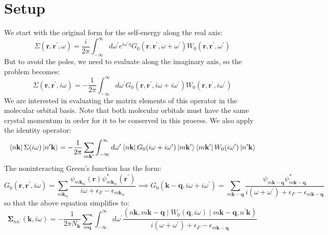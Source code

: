 \documentclass[12pt]{article}
\begin{document}
\section{Setup}
We start with the original form for the self-energy along the real axis:
\begin{equation}
\Sigma\left(\mathbf{r}, \mathbf{r}^{\prime}, \omega\right)=\frac{i}{2 \pi} \int_{-\infty}^{\infty} d \omega^{\prime} e^{i \omega^{\prime} \eta} G_{0}\left(\mathbf{r}, \mathbf{r}^{\prime}, \omega+\omega^{\prime}\right) W_{0}\left(\mathbf{r}, \mathbf{r}^{\prime}, \omega^{\prime}\right)
\end{equation}
But to avoid the poles, we need to evaluate along the imaginary axis, so the problem becomes:
\begin{equation*}
\Sigma\left(\mathbf{r}, \mathbf{r}^{\prime}, i \omega\right)=-\frac{1}{2 \pi} \int_{-\infty}^{\infty} d \omega^{\prime} G_{0}\left(\mathbf{r}, \mathbf{r}^{\prime}, i \omega+i \omega^{\prime}\right) W_{0}\left(\mathbf{r}, \mathbf{r}^{\prime}, i \omega^{\prime}\right) \tag{16}
\end{equation*}
We are interested in evaluating the matrix elements of this operator in the molecular orbital basis. Note that both molecular orbitals must have the same crystal momentum in order for it to be conserved in this process. We also apply the identity operator:
\begin{equation}
    \bra{n\mathbf{k}} \Sigma (i \omega) \ket{n^\prime\mathbf{k}} = -\frac{1}{2 \pi} \sum_{m\mathbf{k}^\prime}\int_{-\infty}^{\infty} d \omega^{\prime} \bra{n\mathbf{k}} G_0(i \omega + i \omega^{\prime}) \ket{m\mathbf{k^\prime}}\bra{m\mathbf{k^\prime}}W_0(i \omega^{\prime}) \ket{n^\prime\mathbf{k}}
\end{equation}
The noninteracting Green's function has the form:
\begin{equation*}
G_{0}\left(\mathbf{r}, \mathbf{r}^{\prime}, i \omega\right)=\sum_{m \mathbf{k}_{m}} \frac{\psi_{m \mathbf{k}_{m}}(\mathbf{r}) \psi_{m \mathbf{k}_{m}}^{*}\left(\mathbf{r^\prime}\right)}{i \omega+\epsilon_{F}-\epsilon_{m \mathbf{k}_{m}}} \implies G_{0}\left(\mathbf{k} - \mathbf{q}, i \omega + i \omega^{\prime}\right) = \sum_{m \mathbf{k}-\mathbf{q}} \frac{\psi_{m \mathbf{k}-\mathbf{q}} \psi_{m \mathbf{k}-\mathbf{q}}^{*}}{i \left(\omega + \omega^{\prime}\right) + \epsilon_{F} - \epsilon_{m \mathbf{k}-\mathbf{q}}}
\end{equation*}
so that the above equation simplifies to:
\begin{equation}
    \boldsymbol{\Sigma}_{n n^{\prime}}(\mathbf{k}, i \omega) = -\frac{1}{2 \pi N_{\mathbf{k}}} \sum_{m \mathbf{q}} \int_{-\infty}^{\infty} d \omega^{\prime} \frac{(n\mathbf{k}, m\mathbf{k}-\mathbf{q} \mid W_0 (\mathbf{q}, i\omega )\mid m \mathbf{k}-\mathbf{q}, n^{\prime}\mathbf{k})}{i \left(\omega + \omega^{\prime}\right) + \epsilon_{F} - \epsilon_{m \mathbf{k}-\mathbf{q}}}
\end{equation}
\end{document}
